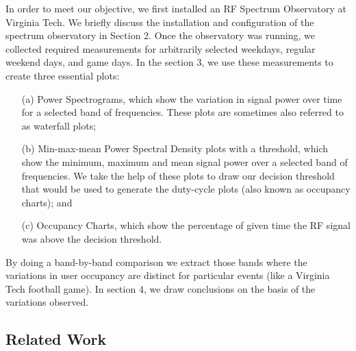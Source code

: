 \documentclass[12pt,sts]{report}
\begin{document}
	In order to meet our objective, we first installed an RF Spectrum Observatory at Virginia Tech. We briefly discuss the installation and configuration of the spectrum observatory in Section 2. Once the observatory was running, we collected required measurements for arbitrarily selected weekdays, regular weekend days, and game days. In the section 3, we use these measurements to create three essential plots:
	\begin{enumerate}
		\item[(a)] Power Spectrograms, which show the variation in signal power over time for a selected band of frequencies. These plots are sometimes also referred to as waterfall plots; %
		\item[(b)] Min-max-mean Power Spectral Density plots with a threshold, which show the minimum, maximum and mean signal power over a selected band of frequencies. We take the help of these plots to draw our decision threshold that would be used to generate the duty-cycle plots (also known as occupancy charts); and%
		\item[(c)] Occupancy Charts, which show the percentage of given time the RF signal was above the decision threshold. %
	\end{enumerate}
	By doing a band-by-band comparison we extract those bands where the variations in user occupancy are distinct for particular events (like a Virginia Tech football game). In section 4, we draw conclusions on the basis of the variations observed.

\subsection{Related Work}
\end{document}
